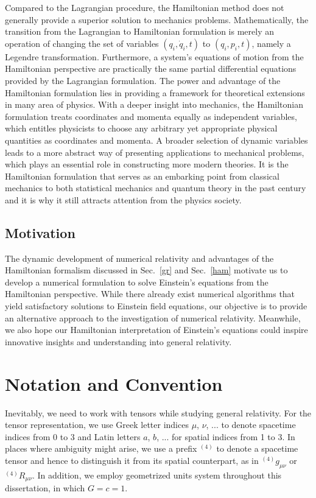 Compared to the Lagrangian procedure, the Hamiltonian method does not generally provide a superior solution to mechanics problems. Mathematically, the transition from the Lagrangian to Hamiltonian formulation is merely an operation of changing the set of variables $(q_{i}, {\dot q}_{i}, t)$ to $(q_{i}, p_{i}, t)$, namely a Legendre transformation. Furthermore, a system's equations of motion from the Hamiltonian perspective are practically the same partial differential equations provided by the Lagrangian formulation. The power and advantage of the Hamiltonian formulation lies in providing a framework for theoretical extensions in many area of physics. With a deeper insight into mechanics, the Hamiltonian formulation treats coordinates and momenta equally as independent variables, which entitles physicists to choose any arbitrary yet appropriate physical quantities as coordinates and momenta. A broader selection of dynamic variables leads to a more abstract way of presenting applications to mechanical problems, which plays an essential role in constructing more modern theories. It is the Hamiltonian formulation that serves as an embarking point from classical mechanics to both statistical mechanics and quantum theory in the past century and it is why it still attracts attention from the physics society\cite{goldstein}. 
\subsection{Motivation}
The dynamic development of numerical relativity and advantages of the Hamiltonian formalism discussed in Sec.~\ref{gr} and Sec.~\ref{ham} motivate us to develop a numerical formulation to solve Einstein's equations from the Hamiltonian perspective. While there already exist numerical algorithms that yield satisfactory solutions to Einstein field equations, our objective is to provide an alternative approach to the investigation of numerical relativity. Meanwhile, we also hope our Hamiltonian interpretation of Einstein's equations could inspire innovative insights and understanding into general relativity. 
\section{Notation and Convention}\label{notation}
Inevitably, we need to work with tensors while studying general relativity. For the tensor representation, we use Greek letter indices $\mu$, $\nu$, ... to denote spacetime indices from 0 to 3 and Latin letters $a$, $b$, ... for spatial indices from 1 to 3. In places where ambiguity might arise, we use a prefix $^{(4)}$ to denote a spacetime tensor and hence to distinguish it from its spatial counterpart, as in $^{(4)}g_{\mu\nu}$ or $^{(4)}R_{\mu\nu}$. In addition, we employ geometrized units system throughout this dissertation, in which $G = c = 1$.


